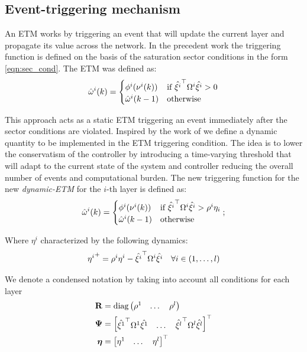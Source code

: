 \documentclass{ifacconf}
\theoremstyle{plain}
\begin{document}
\subsection{Event-triggering mechanism}
An ETM works by triggering an event that will update the current layer and propagate its value across the network. 
In the precedent work \cite{css-extended} the triggering function is defined on the basis of the saturation sector conditions in the form \eqref{eqn:sec_cond}. The ETM was defined as:
\begin{equation}
  \hat{\omega}^{i}(k) = \begin{cases}
    \phi^i(\nu^i(k)) & \text{if } {\hat{\xi^i}}^\top \Omega^i \hat{\xi^i} > 0\\
    \hat{\omega}^{i}(k-1) & \text{otherwise}
  \end{cases}
\end{equation}

This approach acts as a static ETM triggering an event immediately after the sector conditions are violated. Inspired by the work of \cite{data-driven} we define a dynamic quantity to be implemented in the ETM triggering condition. The idea is to lower the conservatism of the controller by introducing a time-varying threshold that will adapt to the current state of the system and controller reducing the overall number of events and computational burden. The new triggering function for the new \emph{dynamic-ETM} for the $i$-th layer is defined as:
\begin{equation}\label{eqn:dynamic_trig}
  \hat{\omega}^{i}(k) = \begin{cases}
    \phi^i(\nu^i(k)) & \text{if } {\hat{\xi^i}}^\top \Omega^i \hat{\xi^i} > \rho^i \eta_i\\
    \hat{\omega}^{i}(k-1) & \text{otherwise}
  \end{cases};
\end{equation}

Where $\eta^i$ characterized by the following dynamics:
\begin{equation}\label{eqn:eta_dynamics}
  {\eta^i}^+ = \rho^i \eta^i - {\hat{\xi^i}}^\top \Omega^i \hat{\xi^i}\quad  \forall i \in \left( 1, \dots, l \right) 
\end{equation}

We denote a condensed notation by taking into account all conditions for each layer
\begin{equation}
\begin{aligned}
   {\bf{R}} &= \text{diag} \left(\begin{matrix}\rho^1 & \dots & \rho^l \end{matrix}\right)\\
   \mathbf{\Psi} &= \left[\begin{matrix} {\hat{\xi^1}}^\top \Omega^1 \hat{\xi^1} & \dots & {\hat{\xi^l}}^\top \Omega^l \hat{\xi^l}\end{matrix}\right]^\top\\
   \boldsymbol{\eta} &= \left[\begin{matrix} \eta^1 & \dots & \eta^l\end{matrix}\right]^\top   
\end{aligned}
\end{equation}
\end{document}
